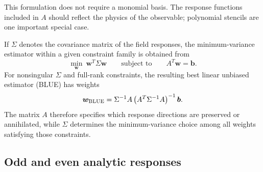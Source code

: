 \documentclass[aps,prd,reprint,twocolumn,superscriptaddress,nofootinbib,longbibliography]{revtex4-2}
\begin{document}
This formulation does not require a monomial basis. The response
functions included in $A$ should reflect the physics of the observable;
polynomial stencils are one important special case.

If $\Sigma$ denotes the covariance matrix of the field responses, the
minimum-variance estimator within a given constraint family is obtained
from
\begin{equation}
\min_{\bm w}\ \bm w^T\Sigma\bm w
\qquad\text{subject to}\qquad
A^T\bm w=\bm b.
\label{eq:constrained_minimization}
\end{equation}
For nonsingular $\Sigma$ and full-rank constraints, the resulting best
linear unbiased estimator (BLUE) has weights
\begin{equation}
\bm w_{\rm BLUE}
=
\Sigma^{-1}A
\left(A^T\Sigma^{-1}A\right)^{-1}\bm b.
\label{eq:blueweights}
\end{equation}
The matrix $A$ therefore specifies which response directions are
preserved or annihilated, while $\Sigma$ determines the
minimum-variance choice among all weights satisfying those constraints.


\subsection{Odd and even analytic responses}
\end{document}
